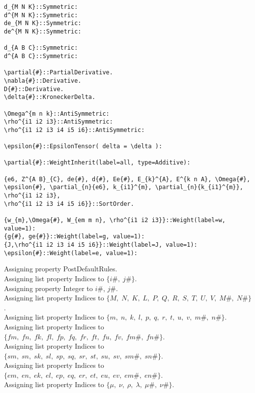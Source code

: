 \documentclass[11pt]{article}
\begin{document}
{\begin{verbatim}
d_{M N K}::Symmetric:
d^{M N K}::Symmetric:
de_{M N K}::Symmetric:
de^{M N K}::Symmetric:

d_{A B C}::Symmetric:
d^{A B C}::Symmetric:

\partial{#}::PartialDerivative.
\nabla{#}::Derivative.
D{#}::Derivative.
\delta{#}::KroneckerDelta.

\Omega^{m n k}::AntiSymmetric:
\rho^{i1 i2 i3}::AntiSymmetric:
\rho^{i1 i2 i3 i4 i5 i6}::AntiSymmetric:

\epsilon{#}::EpsilonTensor( delta = \delta ):

\partial{#}::WeightInherit(label=all, type=Additive):

{e6, Z^{A B}_{C}, de{#}, d{#}, Ee{#}, E_{k}^{A}, E^{k n A}, \Omega{#}, \epsilon{#}, \partial_{n}{e6}, k_{i1}^{m}, \partial_{n}{k_{i1}^{m}},  \rho^{i1 i2 i3},  
\rho^{i1 i2 i3 i4 i5 i6}}::SortOrder.

{w_{m},\Omega{#}, W_{em m n}, \rho^{i1 i2 i3}}::Weight(label=w, value=1):
{g{#}, ge{#}}::Weight(label=g, value=1):
{J,\rho^{i1 i2 i3 i4 i5 i6}}::Weight(label=J, value=1):
\epsilon{#}::Weight(label=e, value=1):
\end{verbatim}}
Assigning property PostDefaultRules.
\\
Assigning list property Indices to $\{i\#,\; j\#\}$.
\\
Assigning property Integer to $i\#$, $j\#$.
\\
Assigning list property Indices to $\{M,\; N,\; K,\; L,\; P,\; Q,\; R,\; S,\; T,\; U,\; V,\; M\#,\; N\#\}$.
\\
Assigning list property Indices to $\{m,\; n,\; k,\; l,\; p,\; q,\; r,\; t,\; u,\; v,\; m\#,\; n\#\}$.
\\
Assigning list property Indices to $\{fm,\; fn,\; fk,\; fl,\; fp,\; fq,\; fr,\; ft,\; fu,\; fv,\; fm\#,\; fn\#\}$.
\\
Assigning list property Indices to $\{sm,\; sn,\; sk,\; sl,\; sp,\; sq,\; sr,\; st,\; su,\; sv,\; sm\#,\; sn\#\}$.
\\
Assigning list property Indices to $\{em,\; en,\; ek,\; el,\; ep,\; eq,\; er,\; et,\; eu,\; ev,\; em\#,\; en\#\}$.
\\
Assigning list property Indices to $\{\mu,\; \nu,\; \rho,\; \lambda,\; \mu\#,\; \nu\#\}$.
\end{document}
